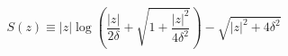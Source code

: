\documentclass[border=2pt,varwidth]{standalone}
\begin{document}
\[
 S(z) \equiv |z| \log\left(
  \frac{|z|}{2\delta} + \sqrt{1 + \frac{|z|^2}{4 \delta^2}}
 \right) - \sqrt{|z|^2 + 4 \delta^2}
\]
\end{document}
